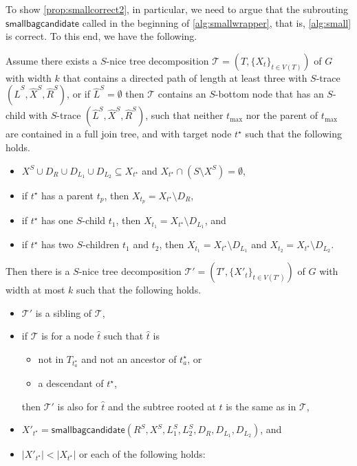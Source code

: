 \documentclass[a4paper,UKenglish,cleveref, autoref, thm-restate, numberwithinsect]{lipics-v2021}
\newcommand{\smallbagc}{\mathsf{smallbagcandidate}}
\newcommand{\slim}{\text{slim}\xspace}
\newcommand{\topheavy}{\text{top-heavy}\xspace}
\begin{document}
To show \cref{prop:smallcorrect2}, in particular, we need to argue that the subrouting $\smallbagc$ called in the beginning of \cref{alg:smallwrapper}, that is, \cref{alg:small} is correct. To this end, we have the following.


\begin{lemma}\label{prop:smallcorrect}
Assume there exists a \slim $S$-nice tree decomposition $\mathcal{T}=(T,\{X_t\}_{t\in V(T)})$ of $G$ with width $k$ that contains a directed path of length at least three with $S$-trace $(\hat{L}^S, \hat{X}^S, \hat{R}^S)$, or if $\hat{L}^S=\emptyset$ then $\mathcal{T}$ contains an $S$-bottom node that has an $S$-child with $S$-trace $(\hat{L}^S, \hat{X}^S, \hat{R}^S)$, such that neither $t_{\max}$ nor the parent of $t_{\max}$ are contained in a full join tree, and with target node ${t^\star}$ such that the following holds.
\begin{itemize}
\item $X^S\cup D_R\cup D_{L_1}\cup D_{L_2}\subseteq X_{t^\star}$ and $X_{t^\star}\cap (S\setminus X^S)=\emptyset$, 
    \item if $t^\star$ has a parent $t_p$, then $X_{t_p}=X_{t^\star}\setminus D_R$, 
    \item if $t^\star$ has one $S$-child $t_1$, then $X_{t_1}=X_{t^\star}\setminus D_{L_1}$, and 
    \item if $t^\star$ has two $S$-children $t_1$ and $t_2$, then $X_{t_1}=X_{t^\star}\setminus D_{L_1}$ and $X_{t_2}=X_{t^\star}\setminus D_{L_2}$.
\end{itemize} 
Then there is a \slim $S$-nice tree decomposition $\mathcal{T}'=(T',\{X'_t\}_{t\in V(T')})$ of $G$ with width at most $k$ 
such that the following holds.
\begin{itemize}
\item $\mathcal{T}'$ is a sibling of $\mathcal{T}$,  
\item if $\mathcal{T}$ is \topheavy for a node $\hat{t}$ such that $\hat{t}$ is
\begin{itemize}
    \item not in $T_{t^\star_a}$ and not an ancestor of $t^\star_a$, or
    \item a descendant of $t^\star$,
\end{itemize}
then $\mathcal{T}'$ is also \topheavy for $\hat{t}$ and the subtree rooted at $\hat{t}$ is the same as in $\mathcal{T}$, 
\item $X'_{t^{\star}}=\smallbagc(R^S,X^S,L_1^S,L_2^S,D_R,D_{L_1},D_{L_2})$, and
\item $|X'_{t^{\star}}|<|X_{t^{\star}}|$ or each of the following holds:

\end{itemize}
\end{lemma}
\end{document}

